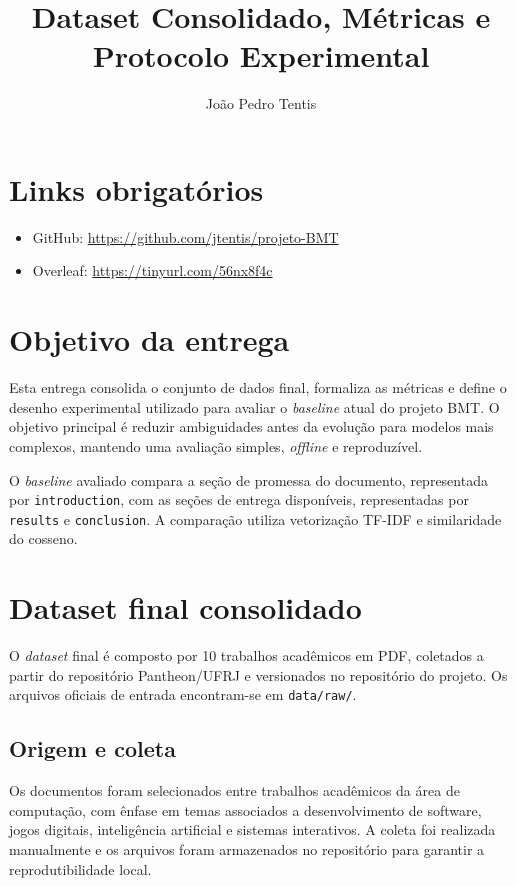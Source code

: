 \documentclass[12pt]{article}
\title{\textbf{Dataset Consolidado, Métricas e Protocolo Experimental}}
\author{João Pedro Tentis\inst{1}}
\begin{document}
 

\maketitle

\section{Links obrigatórios}

\begin{itemize}
    \item GitHub: \url{https://github.com/jtentis/projeto-BMT}
    \item Overleaf: \url{https://tinyurl.com/56nx8f4c}
\end{itemize}

\section{Objetivo da entrega}

Esta entrega consolida o conjunto de dados final, formaliza as métricas e define o desenho experimental utilizado para avaliar o \textit{baseline} atual do projeto BMT. O objetivo principal é reduzir ambiguidades antes da evolução para modelos mais complexos, mantendo uma avaliação simples, \textit{offline} e reproduzível.

O \textit{baseline} avaliado compara a seção de promessa do documento, representada por \texttt{introduction}, com as seções de entrega disponíveis, representadas por \texttt{results} e \texttt{conclusion}. A comparação utiliza vetorização TF-IDF e similaridade do cosseno.

\section{Dataset final consolidado}

O \textit{dataset} final é composto por 10 trabalhos acadêmicos em PDF, coletados a partir do repositório Pantheon/UFRJ e versionados no repositório do projeto. Os arquivos oficiais de entrada encontram-se em \texttt{data/raw/}.

\subsection{Origem e coleta}

Os documentos foram selecionados entre trabalhos acadêmicos da área de computação, com ênfase em temas associados a desenvolvimento de software, jogos digitais, inteligência artificial e sistemas interativos. A coleta foi realizada manualmente e os arquivos foram armazenados no repositório para garantir a reprodutibilidade local.
\end{document}
